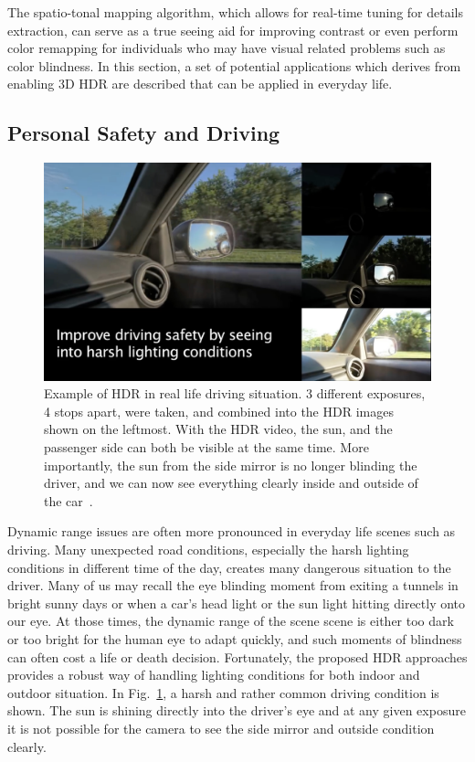The spatio-tonal mapping algorithm, which allows for real-time tuning for details extraction, can serve 
as a true seeing aid for improving contrast or even perform color remapping for individuals who may 
have visual related problems such as color blindness. In this section, a set of potential applications 
which derives from enabling 3D HDR are described that can be applied in everyday life.

\subsection{Personal Safety and Driving}
\begin{figure}
\center
 \includegraphics[width=5.5in]{ch2/diagrams/everyday3.jpg}
 \caption{Example of HDR in real life driving situation. 3 different exposures, 4 stops apart, were 
taken, and combined into the HDR images shown on the leftmost. With the HDR video, the sun, and 
the passenger side can both be visible at the same time. More importantly, the sun from the side 
mirror is no longer blinding the driver, and we can now see everything clearly inside and outside of 
the car~\cite{mann2012hdrchitecture}.}
 \label{fig:extremeeveryday3}
\end{figure}
Dynamic range issues are often more pronounced in everyday life scenes such as driving. Many 
unexpected road conditions, especially the harsh lighting conditions in different time of the day, 
creates many dangerous situation to the driver. Many of us may recall the eye blinding moment from 
exiting a tunnels in bright sunny days or when a car's head light or the sun light hitting directly onto 
our eye.  At those times, the dynamic range of the scene scene is either too dark or too bright for the 
human eye to adapt quickly, and such moments of blindness can often cost a life or death decision. 
Fortunately, the proposed HDR approaches provides a robust way of handling lighting conditions for 
both indoor and outdoor situation. In Fig.~\ref{fig:extremeeveryday3}, a harsh and rather common 
driving condition is shown. The sun is shining directly into the driver's eye and at any given exposure 
it is not possible for the camera to see the side mirror and outside condition clearly.

